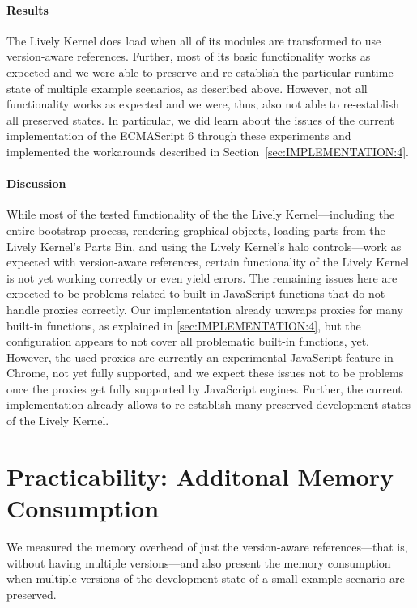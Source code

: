 \paragraph{Results}
The Lively Kernel does load when all of its modules are transformed to use version-aware references.
Further, most of its basic functionality works as expected and we were able to preserve and re-establish the particular runtime state of multiple example scenarios, as described above.
However, not all functionality works as expected and we were, thus, also not able to re-establish all preserved states. 
In particular, we did learn about the issues of the current implementation of the ECMAScript 6 through these experiments and implemented the workarounds described in Section~\ref{sec:IMPLEMENTATION:4}.

\paragraph{Discussion}
While most of the tested functionality of the the Lively Kernel---including the entire bootstrap process, rendering graphical objects, loading parts from the Lively Kernel's Parts Bin, and using the Lively Kernel's halo controls---work as expected with version-aware references, certain functionality of the Lively Kernel is not yet working correctly or even yield errors.
The remaining issues here are expected to be problems related to built-in JavaScript functions that do not handle proxies correctly.
Our implementation already unwraps proxies for many built-in functions, as explained in \ref{sec:IMPLEMENTATION:4}, but the configuration appears to not cover all problematic built-in functions, yet.
However, the used proxies are currently an experimental JavaScript feature in Chrome, not yet fully supported, and we expect these issues not to be problems once the proxies get fully supported by JavaScript engines.
Further, the current implementation already allows to re-establish many preserved development states of the Lively Kernel.




\section{Practicability: Additonal Memory Consumption} \label{sec:DISCUSSION:2}

We measured the memory overhead of just the version-aware references---that is, without having multiple versions---and also present the memory consumption when multiple versions of the development state of a small example scenario are preserved.

